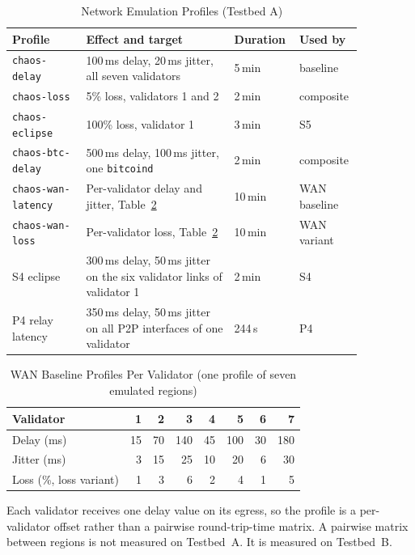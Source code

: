 \begin{table}[h]
\caption{Network Emulation Profiles (Testbed A)}
\label{tab:netem-profiles}
\centering
\footnotesize
\begin{tabular}{@{}p{0.2\linewidth}p{0.4\linewidth}p{0.12\linewidth}p{0.14\linewidth}@{}}
\toprule
\textbf{Profile} & \textbf{Effect and target} & \textbf{Duration} & \textbf{Used by} \\
\midrule
\texttt{chaos-delay} & 100\,ms delay, 20\,ms jitter, all seven validators & 5\,min & baseline \\
\texttt{chaos-loss} & 5\% loss, validators 1 and 2 & 2\,min & composite \\
\texttt{chaos-eclipse} & 100\% loss, validator 1 & 3\,min & S5 \\
\texttt{chaos-btc-delay} & 500\,ms delay, 100\,ms jitter, one \texttt{bitcoind} & 2\,min & composite \\
\texttt{chaos-wan-latency} & Per-validator delay and jitter, Table~\ref{tab:netem-wan} & 10\,min & WAN baseline \\
\texttt{chaos-wan-loss} & Per-validator loss, Table~\ref{tab:netem-wan} & 10\,min & WAN variant \\
S4 eclipse & 300\,ms delay, 50\,ms jitter on the six validator links of validator 1 & 2\,min & S4 \\
P4 relay latency & 350\,ms delay, 50\,ms jitter on all P2P interfaces of one validator & 244\,s & P4 \\
\bottomrule
\end{tabular}
\end{table}

\begin{table}[h]
\caption{WAN Baseline Profiles Per Validator (one profile of seven emulated regions)}
\label{tab:netem-wan}
\centering
\footnotesize
\begin{tabular}{@{}lrrrrrrr@{}}
\toprule
\textbf{Validator} & 1 & 2 & 3 & 4 & 5 & 6 & 7 \\
\midrule
Delay (ms)  & 15 & 70 & 140 & 45 & 100 & 30 & 180 \\
Jitter (ms) & 3 & 15 & 25 & 10 & 20 & 6 & 30 \\
Loss (\%, loss variant) & 1 & 3 & 6 & 2 & 4 & 1 & 5 \\
\bottomrule
\end{tabular}
\end{table}

Each validator receives one delay value on its egress, so the profile is a
per-validator offset rather than a pairwise round-trip-time matrix. A
pairwise matrix between regions is not measured on Testbed~A.
\iftestbedB It is measured on Testbed~B.\fi
